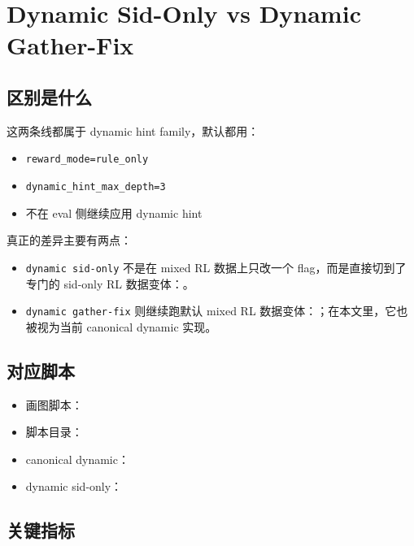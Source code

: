 \section{Dynamic Sid-Only vs Dynamic Gather-Fix}

\subsection{区别是什么}

这两条线都属于 dynamic hint family，默认都用：

\begin{itemize}
\item \texttt{reward\_mode=rule\_only}
\item \texttt{dynamic\_hint\_max\_depth=3}
\item 不在 eval 侧继续应用 dynamic hint
\end{itemize}

真正的差异主要有两点：

\begin{itemize}
\item \texttt{dynamic sid-only} 不是在 mixed RL 数据上只改一个 flag，而是直接切到了专门的 sid-only RL 数据变体：。
\item \texttt{dynamic gather-fix} 则继续跑默认 mixed RL 数据变体：；在本文里，它也被视为当前 canonical dynamic 实现。
\end{itemize}

\subsection{对应脚本}

{\footnotesize
\begin{itemize}
\item 画图脚本：
\item 脚本目录：
\item canonical dynamic：
\item dynamic sid-only：
\end{itemize}
}

\subsection{关键指标}

